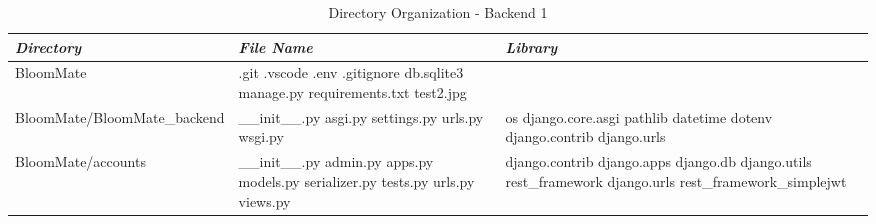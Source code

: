 \documentclass[conference, a4paper]{IEEEtran}
\begin{document}
\newpage
\begin{table} [htp]
    \caption{Directory Organization - Backend 1}
    \centering
    \renewcommand{\arraystretch}{1.3}
    \begin{tabular}{p{1.7cm}|p{2.8cm}|p{2.5cm}}
    \hline
    \textit{\textbf{Directory}} & \textit{\textbf{File Name}} & \textit{\textbf{Library}} \\
     \hline
 BloomMate & .git \newline .vscode \newline .env \newline .gitignore \newline db.sqlite3 \newline manage.py \newline requirements.txt \newline test2.jpg & \\
 \hline
 BloomMate\newline/BloomMate\_\newline backend & \_\_init\_\_.py \newline asgi.py \newline settings.py \newline urls.py \newline wsgi.py & os \newline django.core.asgi \newline pathlib \newline datetime \newline dotenv \newline django.contrib \newline django.urls \\
 \hline
 BloomMate\newline/accounts & \_\_init\_\_.py \newline admin.py \newline apps.py \newline models.py \newline serializer.py \newline tests.py \newline urls.py \newline views.py & django.contrib \newline django.apps \newline django.db \newline django.utils \newline rest\_framework \newline django.urls \newline rest\_framework\_simplejwt \\

\end{tabular}
\end{table}
\end{document}
